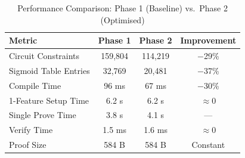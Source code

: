 \begin{table}[H]
\centering
\caption{Performance Comparison: Phase 1 (Baseline) vs.\ Phase 2 (Optimised)}
\label{tab:phase_comparison}
\begin{tabular}{|l|c|c|c|}
\hline
\textbf{Metric} & \textbf{Phase 1} & \textbf{Phase 2} & \textbf{Improvement} \\
\hline
Circuit Constraints        & 159,804 & 114,219 & $-$29\% \\
Sigmoid Table Entries      & 32,769  & 20,481  & $-$37\% \\
Compile Time               & 96 ms   & 67 ms   & $-$30\% \\
1-Feature Setup Time       & 6.2 s   & 6.2 s   & $\approx$0 \\
Single Prove Time          & 3.8 s   & 4.1 s   & --- \\
Verify Time                & 1.5 ms  & 1.6 ms  & $\approx$0 \\
Proof Size                 & 584 B   & 584 B   & Constant \\
\hline
\end{tabular}
\end{table}
